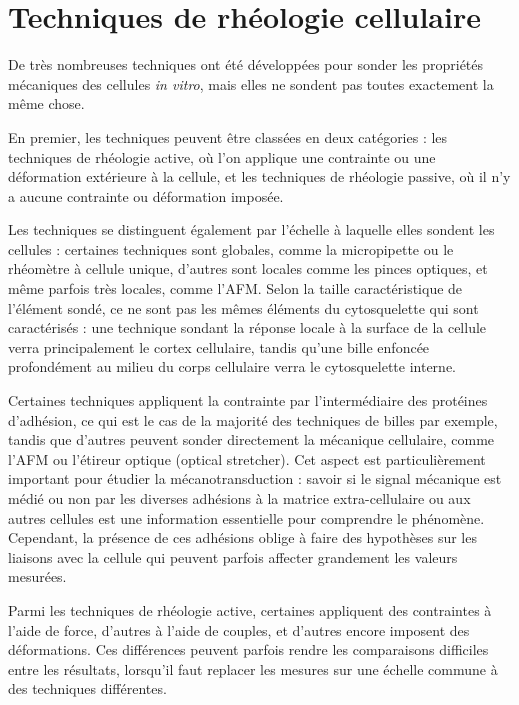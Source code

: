 \section{Techniques de rhéologie cellulaire}

De très nombreuses techniques ont été développées pour sonder les propriétés mécaniques des cellules \textit{in vitro}, mais elles ne sondent pas toutes exactement la même chose. 

En premier, les techniques peuvent être classées en deux catégories : les techniques de rhéologie active, où l'on applique une contrainte ou une déformation extérieure à la cellule, et les techniques de rhéologie passive, où il n'y a aucune contrainte ou déformation imposée. 

Les techniques se distinguent également par l'échelle à laquelle elles sondent les cellules : certaines techniques sont globales, comme la micropipette ou le rhéomètre à cellule unique, d'autres sont locales comme les pinces optiques, et même parfois très locales, comme l'AFM. 
Selon la taille caractéristique de l'élément sondé, ce ne sont pas les mêmes éléments du cytosquelette qui sont caractérisés : une technique sondant la réponse locale à la surface de la cellule verra principalement le cortex cellulaire, tandis qu'une bille enfoncée profondément au milieu du corps cellulaire verra le cytosquelette interne. 

Certaines techniques appliquent la contrainte par l'intermédiaire des protéines d'adhésion, ce qui est le cas de la majorité des techniques de billes par exemple, tandis que d'autres peuvent sonder directement la mécanique cellulaire, comme l'AFM ou l'étireur optique (optical stretcher). Cet aspect est particulièrement important pour étudier la mécanotransduction : savoir si le signal mécanique est médié ou non par les diverses adhésions à la matrice extra-cellulaire ou aux autres cellules est une information essentielle pour comprendre le phénomène. 
Cependant, la présence de ces adhésions oblige à faire des hypothèses sur les liaisons avec la cellule qui peuvent parfois affecter grandement les valeurs mesurées. 

Parmi les techniques de rhéologie active, certaines appliquent des contraintes à l'aide de force, d'autres à l'aide de couples, et d'autres encore imposent des déformations. Ces différences peuvent parfois rendre les comparaisons difficiles entre les résultats, lorsqu'il faut replacer les mesures sur une échelle commune à des techniques différentes. 

